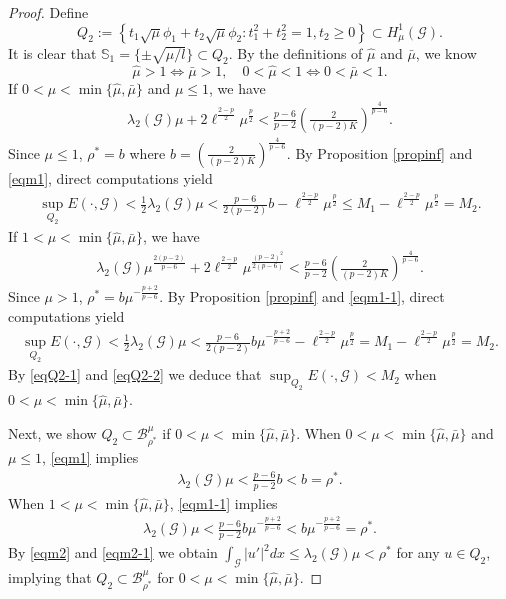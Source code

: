 \documentclass[10pt,a4paper]{article}
\theoremstyle{definition} \theoremstyle{remark}
\numberwithin{equation}{section}
\newcommand{\G}{\mathcal{G}}
\newcommand{\B}{\mathcal{B}}
\newcommand{\s}{\mathbb{S}}
\newcommand{\la}{\lambda}
\begin{document}
\begin{proof}
	Define
	$$
	Q_2:= \left\{t_1\sqrt{\mu}\phi_1+t_2\sqrt{\mu}\phi_2: t^2_1 + t^2_2 = 1, t_2 \geq 0\right\} \subset H^1_\mu(\G).
	$$
	It is clear that $\s_1 = \{\pm \sqrt{\mu/l}\} \subset Q_2$. By the definitions of $\hat{\mu}$ and $\bar{\mu}$, we know
	$$
	\hat{\mu} > 1 \Leftrightarrow \bar{\mu} > 1,  \quad 0 < \hat{\mu} < 1 \Leftrightarrow 0< \bar{\mu} < 1.
	$$
	If $0 < \mu < \min\{\hat{\mu}, \bar{\mu}\}$ and $\mu \leq 1$,  we have
	\begin{align} \label{eqm1}
		\la_2(\G)\mu + 2\ell^{\frac{2-p}2}\mu^{\frac p2} < \frac{p-6}{p-2}\left( \frac2{(p-2)K}\right)^{\frac4{p-6}}.
	\end{align}
    Since $\mu \leq 1$, $\rho^* = b$ where $b = \left( \frac2{(p-2)K}\right)^{\frac4{p-6}}$. By Proposition \ref{propinf} and \eqref{eqm1}, direct computations yield
    \begin{align} \label{eqQ2-1}
    	\sup_{Q_2} E(\cdot,\G) < \frac12\la_2(\G)\mu < \frac{p-6}{2(p-2)}b - \ell^{\frac{2-p}2}\mu^{\frac p2} \leq M_1 - \ell^{\frac{2-p}2}\mu^{\frac p2} = M_2.
    \end{align}
    If $1 < \mu < \min\{\hat{\mu}, \bar{\mu}\}$, we have
    \begin{align} \label{eqm1-1}
    	\la_2(\G)\mu^{\frac{2(p-2)}{p-6}} + 2\ell^{\frac{2-p}2}\mu^{\frac{(p-2)^2}{2(p-6)}} < \frac{p-6}{p-2}\left( \frac2{(p-2)K}\right)^{\frac4{p-6}}.
    \end{align}
    Since $\mu > 1$, $\rho^* = b\mu^{-\frac{p+2}{p-6}}$. By Proposition \ref{propinf} and \eqref{eqm1-1}, direct computations yield
    \begin{align} \label{eqQ2-2}
    	\sup_{Q_2}E(\cdot,\G) < \frac12\la_2(\G)\mu < \frac{p-6}{2(p-2)}b\mu^{-\frac{p+2}{p-6}} - \ell^{\frac{2-p}2}\mu^{\frac p2} = M_1 - \ell^{\frac{2-p}2}\mu^{\frac p2} = M_2.
    \end{align}
    By \eqref{eqQ2-1} and \eqref{eqQ2-2} we deduce that $\sup_{Q_2} E(\cdot,\G) < M_2$ when $0 < \mu < \min\{\hat{\mu},\bar{\mu}\}$.
    
    Next, we show $Q_2 \subset \B_{\rho^*}^\mu$ if $0 < \mu < \min\{\hat{\mu},\bar{\mu}\}$. When $0 < \mu < \min\{\hat{\mu}, \bar{\mu}\}$ and $\mu \leq 1$, \eqref{eqm1} implies
    \begin{align} \label{eqm2}
    	\la_2(\G)\mu < \frac{p-6}{p-2}b < b = \rho^*.
    \end{align} 
    When $1 < \mu < \min\{\hat{\mu}, \bar{\mu}\}$, \eqref{eqm1-1} implies
    \begin{align} \label{eqm2-1}
    	\la_2(\G)\mu < \frac{p-6}{p-2}b\mu^{-\frac{p+2}{p-6}} < b\mu^{-\frac{p+2}{p-6}} = \rho^*.
    \end{align}
    By \eqref{eqm2} and \eqref{eqm2-1} we obtain $\int_\G|u'|^2 dx \leq \la_2(\G)\mu < \rho^*$ for any $u \in Q_2$, implying that $Q_2 \subset \B_{\rho^*}^\mu$ for $0 < \mu < \min\{\hat{\mu},\bar{\mu}\}$.


\end{proof}
\end{document}
